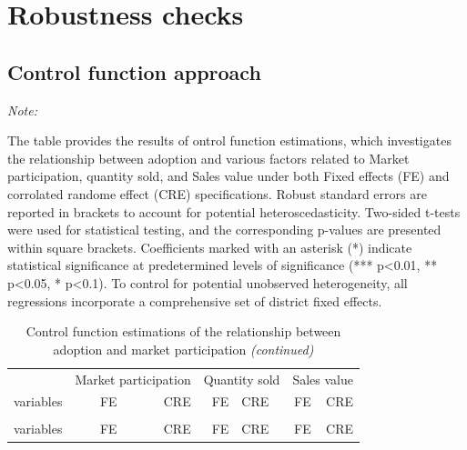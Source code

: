 \documentclass[
]{article}
\begin{document}
\hypertarget{robustness-checks}{%
\section{Robustness checks}\label{robustness-checks}}

\hypertarget{control-function-approach}{%
\subsection{Control function approach}\label{control-function-approach}}

\begingroup\fontsize{7}{9}\selectfont

\begin{ThreePartTable}
\begin{TableNotes}[para]
\item \textit{Note: } 
\item The table provides the results of ontrol function estimations, which investigates the relationship between adoption and various factors related to Market participation, quantity sold, and Sales value under both Fixed effects (FE) and corrolated randome effect (CRE) specifications. Robust standard errors are reported in brackets to account for potential heteroscedasticity. Two-sided t-tests were used for statistical testing, and the corresponding p-values are presented within square brackets. Coefficients marked with an asterisk (*) indicate statistical significance at predetermined levels of significance (*** p<0.01, ** p<0.05, * p<0.1). To control for potential unobserved heterogeneity, all regressions incorporate a comprehensive set of district fixed effects.
\end{TableNotes}
\begin{longtable}[t]{lrrrlrr}
\caption{\label{tab:unnamed-chunk-14}Control function estimations of the relationship between adoption and market participation}\\
\toprule
\multicolumn{1}{c}{ } & \multicolumn{2}{c}{Market participation} & \multicolumn{2}{c}{Quantity sold} & \multicolumn{2}{c}{Sales value} \\
\cmidrule(l{3pt}r{3pt}){2-3} \cmidrule(l{3pt}r{3pt}){4-5} \cmidrule(l{3pt}r{3pt}){6-7}
variables & FE & CRE & FE & CRE & FE & CRE\\
\midrule
\endfirsthead
\caption[]{\label{tab:unnamed-chunk-14}Control function estimations of the relationship between adoption and market participation \textit{(continued)}}\\
\toprule
variables & FE & CRE & FE & CRE & FE & CRE\\
\midrule
\endhead


\end{longtable}
\end{ThreePartTable}
\end{document}
